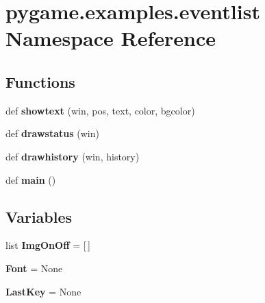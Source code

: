 \hypertarget{namespacepygame_1_1examples_1_1eventlist}{}\section{pygame.\+examples.\+eventlist Namespace Reference}
\label{namespacepygame_1_1examples_1_1eventlist}
\subsection*{Functions}
\begin{DoxyCompactItemize}
\item 
\mbox{\label{namespacepygame_1_1examples_1_1eventlist_acf9bf963805c0b6168148074d8fffa93}} 
def {\bfseries showtext} (win, pos, text, color, bgcolor)
\item 
\mbox{\label{namespacepygame_1_1examples_1_1eventlist_a16b8c0c8d23b61eeb7f1e691a6e61d1a}} 
def {\bfseries drawstatus} (win)
\item 
\mbox{\label{namespacepygame_1_1examples_1_1eventlist_a15012a6bf471b997d6e0f004a91005f9}} 
def {\bfseries drawhistory} (win, history)
\item 
\mbox{\label{namespacepygame_1_1examples_1_1eventlist_a97f8672e50f69e601a4508809206e0a2}} 
def {\bfseries main} ()
\end{DoxyCompactItemize}
\subsection*{Variables}
\begin{DoxyCompactItemize}
\item 
\mbox{\label{namespacepygame_1_1examples_1_1eventlist_adfa067e155e375747843f40fab67a6c5}} 
list {\bfseries Img\+On\+Off} = \mbox{[}$\,$\mbox{]}
\item 
\mbox{\label{namespacepygame_1_1examples_1_1eventlist_a004c47aafec7dc992a80637768c01b56}} 
{\bfseries Font} = None
\item 
\mbox{\label{namespacepygame_1_1examples_1_1eventlist_ae16387a37b80148a88d8f5814aaf7515}} 
{\bfseries Last\+Key} = None
\end{DoxyCompactItemize}


